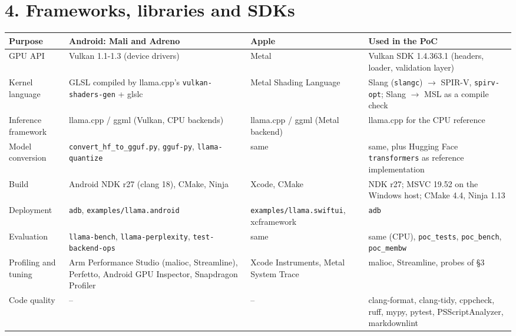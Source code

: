\documentclass[
  10pt,
]{article}
\newcounter{none} %
\begin{document}
\section{4. Frameworks, libraries and
SDKs}\label{frameworks-libraries-and-sdks}

{\def\LTcaptype{none} %
\begin{longtable}[]{@{}
  >{\raggedright\arraybackslash}p{}
  >{\raggedright\arraybackslash}p{}
  >{\raggedright\arraybackslash}p{}
  >{\raggedright\arraybackslash}p{}@{}}
\toprule\noalign{}
\begin{minipage}[b]{\linewidth}\raggedright%
Purpose
\end{minipage} & \begin{minipage}[b]{\linewidth}\raggedright%
Android: Mali and Adreno
\end{minipage} & \begin{minipage}[b]{\linewidth}\raggedright%
Apple
\end{minipage} & \begin{minipage}[b]{\linewidth}\raggedright%
Used in the PoC
\end{minipage} \\
\midrule\noalign{}
\endhead%
\bottomrule\noalign{}
\endlastfoot%
GPU API & Vulkan 1.1-1.3 (device drivers) & Metal & Vulkan SDK 1.4.363.1
(headers, loader, validation layer) \\
Kernel language & GLSL compiled by llama.cpp's
\texttt{vulkan-shaders-gen} + glslc & Metal Shading Language & Slang
(\texttt{slangc}) $\rightarrow$ SPIR-V, \texttt{spirv-opt}; Slang $\rightarrow$ MSL as a compile
check \\
Inference framework & llama.cpp / ggml (Vulkan, CPU backends) &
llama.cpp / ggml (Metal backend) & llama.cpp for the CPU reference \\
Model conversion & \texttt{convert\_hf\_to\_gguf.py}, \texttt{gguf-py},
\texttt{llama-quantize} & same & same, plus Hugging Face
\texttt{transformers} as reference implementation \\
Build & Android NDK r27 (clang 18), CMake, Ninja & Xcode, CMake & NDK
r27; MSVC 19.52 on the Windows host; CMake 4.4, Ninja 1.13 \\
Deployment & \texttt{adb}, \texttt{examples/llama.android} &
\texttt{examples/llama.swiftui}, xcframework & \texttt{adb} \\
Evaluation & \texttt{llama-bench}, \texttt{llama-perplexity},
\texttt{test-backend-ops} & same & same (CPU), \texttt{poc\_tests},
\texttt{poc\_bench}, \texttt{poc\_membw} \\
Profiling and tuning & Arm Performance Studio (malioc, Streamline),
Perfetto, Android GPU Inspector, Snapdragon Profiler & Xcode
Instruments, Metal System Trace & malioc, Streamline, probes of \S{}3 \\
Code quality & -- & -- & clang-format, clang-tidy, cppcheck, ruff, mypy,
pytest, PSScriptAnalyzer, markdownlint \\
\end{longtable}
}
\end{document}
